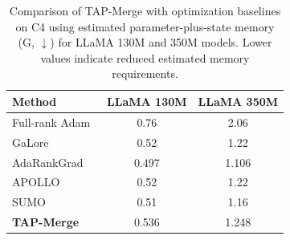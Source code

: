 \begin{table}[t]
\centering\small
\caption{Comparison of TAP-Merge with optimization
baselines on C4 using estimated parameter-plus-state
memory (G, $\downarrow$) for LLaMA 130M and 350M
models. Lower values indicate reduced
estimated memory requirements.}
\label{tab:c4_memory}
\begin{tabular}{lcc}
\toprule
Method & LLaMA 130M & LLaMA 350M\\
\midrule
Full-rank Adam~\cite{galore2024} & 0.76 & 2.06\\
GaLore~\cite{galore2024} & 0.52 & 1.22\\
AdaRankGrad~\cite{adarankgrad2025} & 0.497 & 1.106\\
APOLLO~\cite{apollo2025} & 0.52 & 1.22\\
SUMO~\cite{sumo2025} & 0.51 & 1.16\\
\midrule
\textbf{TAP-Merge} & 0.536 & 1.248\\ \bottomrule
\end{tabular}
\end{table}
